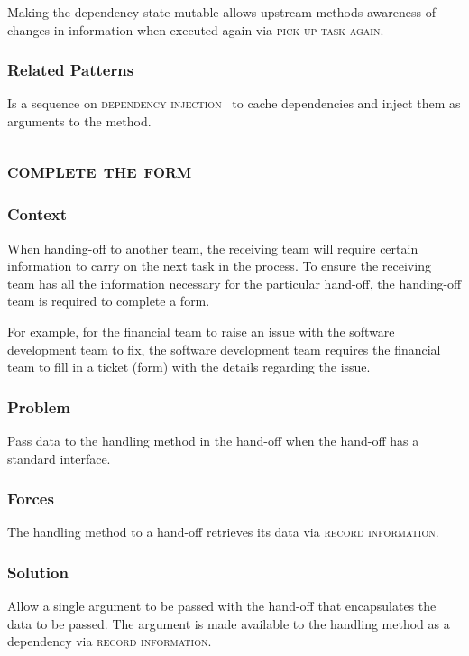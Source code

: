 \documentclass[prodmode]{style/acmlarge}
\begin{document}
Making the dependency state mutable allows upstream methods awareness of changes
in information when executed again via \textsc{pick up task again}.

\subsubsection*{Related Patterns} Is a sequence on \textsc{dependency
injection}~\cite{ioc} to cache dependencies and inject them as arguments to the
method.



\subsection{\textsc{\textbf{complete the form}}}

\subsubsection*{Context} When handing-off to another team, the receiving team
will require certain information to carry on the next task in the process.  To
ensure the receiving team has all the information necessary for the particular
hand-off, the handing-off team is required to complete a form.

For example, for the financial team to raise an issue with the software
development team to fix, the software development team requires the financial
team to fill in a ticket (form) with the details regarding the issue.

\subsubsection*{Problem} Pass data to the handling method in the hand-off when
the hand-off has a standard interface.

\subsubsection*{Forces} The handling method to a hand-off retrieves its data via
\textsc{record information}.

\subsubsection*{Solution} Allow a single argument to be passed with the hand-off
that encapsulates the data to be passed.  The argument is made available to the
handling method as a dependency via \textsc{record information}.
\end{document}
